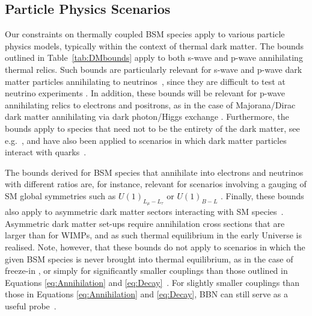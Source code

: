 \documentclass[notitlepage,letterpaper,natbib,aps,prd,onecolumn,amsmath,amsfonts,nofootinbib,preprintnumbers,superscriptaddress,secnumarabic,groupedaddress]{revtex4-1}
\begin{document}
\subsection{Particle Physics Scenarios} 

Our constraints on thermally coupled BSM species apply to various particle physics models, typically within the context of thermal dark matter. The bounds outlined in Table~\ref{tab:DMbounds} apply to both s-wave and p-wave annihilating thermal relics. Such bounds are particularly relevant for s-wave and p-wave dark matter particles annihilating to neutrinos~\cite{Boehm:2006mi,Farzan:2009ji,Farzan:2011ck,Batell:2017cmf,Ballett:2019cqp}, since they are difficult to test at neutrino experiments \cite{Kamada:2015era,Arguelles:2017atb,Alvey:2019jzx,Klop:2018ltd,Kelly:2019wow}. In addition, these bounds will  be relevant for p-wave annihilating relics to electrons and positrons, as in the case of Majorana/Dirac dark matter annihilating via dark photon/Higgs exchange \cite{Krnjaic:2015mbs,Alexander:2016aln,Battaglieri:2017aum,Beacham:2019nyx}. Furthermore, the bounds apply to species that need not to be the entirety of the dark matter, see e.g.~\cite{Berlin:2018sjs}, and have also been applied to scenarios in which dark matter particles interact with  quarks~\cite{Krnjaic:2019dzc}. 

The bounds derived for BSM species that annihilate into electrons and neutrinos with different ratios are, for instance, relevant for scenarios involving a gauging of SM global symmetries such as $U(1)_{L_\mu-L_\tau}$ \cite{Arcadi:2018tly,Kamada:2018zxi,Foldenauer:2018zrz} or $U(1)_{B-L}$ \cite{Okada:2010wd,Escudero:2018fwn}. Finally, these bounds also apply to asymmetric dark matter sectors interacting with SM species~\cite{Zurek:2013wia,Petraki:2013wwa}. Asymmetric dark matter set-ups require annihilation cross sections that are larger than for WIMPs, and as such thermal equilibrium in the early Universe is realised. Note, however, that these bounds do not apply to scenarios in which the given BSM species is never brought into thermal equilibrium, as in the case of freeze-in \cite{Hall:2009bx,Dvorkin:2019zdi}, or simply for significantly smaller couplings than those outlined in Equations \eqref{eq:Annihilation} and \eqref{eq:Decay}~\cite{Berlin:2017ftj}. For slightly smaller couplings than those in Equations \eqref{eq:Annihilation} and \eqref{eq:Decay}, BBN can still serve as a useful probe~\cite{Berlin:2019pbq}.
\end{document}
